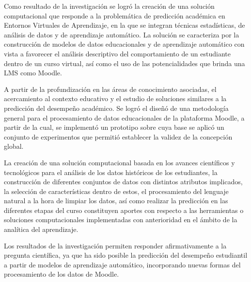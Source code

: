 \begin{conclusions}
    Como resultado de la investigación se logró la creación de una solución computacional que responde a la problemática de predicción académica en Entornos Virtuales de Aprendizaje, en la que se integran 
    técnicas estadísticas, de análisis de datos y de aprendizaje automático. La solución se caracteriza por la construcción de modelos de datos educacionales y de aprendizaje automático con vista a favorecer el análisis descriptivo del comportamiento de un estudiante dentro de un curso virtual, así como 
    el uso de las potencialidades que brinda una LMS como Moodle.  

    A partir de la profundización en las áreas de conocimiento asociadas, el acercamiento al contexto educativo y 
    el estudio de soluciones similares a la predicción del desempeño académico. Se logró el diseñó de una metodología general para el procesamiento de datos educacionales de la plataforma Moodle, a partir de la cual, se implementó un prototipo sobre cuya base se aplicó un conjunto de experimentos que 
    permitió establecer la validez de la concepción global.  

    La creación de una solución computacional basada en los avances científicos y tecnológicos para el análisis de los datos históricos de los estudiantes, la construcción de diferentes conjuntos de datos con distintos atributos implicados, la selección de características dentro de estos, el procesamiento del lenguaje natural a la hora de limpiar los datos, así como realizar la predicción en las diferentes etapas del curso 
    constituyen aportes con respecto a las herramientas o soluciones computacionales implementadas con anterioridad en el ámbito de la analítica del aprendizaje.  
    
    Los resultados de la investigación permiten responder afirmativamente a la pregunta científica, ya que ha sido posible la predicción del desempeño estudiantil a partir de modelos de aprendizaje automático, incorporando nuevas formas del procesamiento de los datos de Moodle. 


\end{conclusions}
